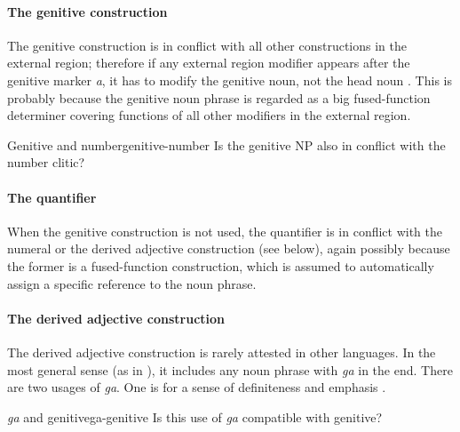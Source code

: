 \documentclass[a4paper, oneside, 12pt]{report}
\newcommand*{\citesec}[1]{\S~{#1}}
\newcommand*{\citefig}[1]{Fig.~{#1}}
\newcommand*{\citepage}[1]{p.~{#1}}
\newcommand{\form}[1]{\emph{#1}}
\begin{document}
\paragraph*{The genitive construction}
The genitive construction is in conflict with all other constructions in the external region; 
therefore if any external region modifier appears after the genitive marker \form{a},
it has to modify the genitive noun, not the head noun
\citep[\citepage{159}]{friesen2017grammar}.
This is probably because the genitive noun phrase 
is regarded as a big fused-function determiner 
covering functions of all other modifiers in the external region.

\begin{todobox}{Genitive and number}{genitive-number}
    Is the genitive NP also in conflict with the number clitic?
\end{todobox}



\paragraph*{The quantifier}
When the genitive construction is not used,
the quantifier is in conflict with the numeral 
or the derived adjective construction (see below),
again possibly because the former is a fused-function construction, 
which is assumed to automatically assign a specific reference to the noun phrase.

\paragraph*{The derived adjective construction}
The derived adjective construction is rarely attested in other languages. 
In the most general sense (as in \citet[\citefig{5.1}]{friesen2017grammar}),
it includes any noun phrase with \form{ga} in the end.
There are two usages of \form{ga}.
One is for a sense of definiteness and emphasis \citep[\citesec{5.3.2}]{friesen2017grammar}.

\begin{todobox}{\form{ga} and genitive}{ga-genitive}
    Is this use of \form{ga} compatible with genitive?
\end{todobox}
\end{document}
